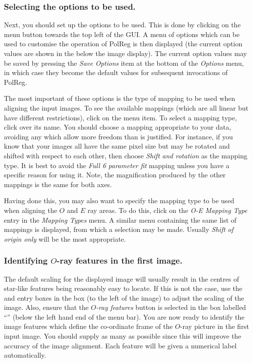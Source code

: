 \subsubsection {Selecting the options to be used.}
Next, you should set up the options to be used. This is done by clicking
on the  menu button towards
the top left of the GUI. A menu of options which can be used to customise
the operation of PolReg is then displayed (the current option values are 
shown in the  below the image 
display). The current option values may be saved by pressing the {\em
Save Options} item at the bottom of the {\em Options} menu, in which case
they become the default values for subsequent invocations of PolReg.

The most important of these options is the type of mapping to be used
when aligning the input images. To see the available mappings (which are
all linear but have different restrictions), click on the  menu item. To select a mapping type,
click over its name. You should choose a mapping appropriate to your
data, avoiding any which allow more freedom than is justified. For
instance, if you know that your images all have the same pixel size but
may be rotated and shifted with respect to each other, then choose {\em
Shift and rotation} as the mapping type. It is best to avoid the {\em
Full 6 parameter fit} mapping unless you have a specific reason for using
it. Note, the magnification produced by the other mappings is the same
for both axes.

Having done this, you may also want to specify the mapping type to be
used when aligning the $O$ and $E$ ray areas. To do this, click on the
{\em O-E Mapping Type} entry in the {\em Mapping Types} menu. A similar
menu containing the same list of mappings is displayed, from which a
selection may be made. Usually {\em Shift of origin only} will be the
most appropriate.


\subsubsection {Identifying $O$-ray features in the first image.}
The default scaling for the displayed image will usually result in the
centres of star-like features being reasonably easy to locate. If this is
not the case, use the  and 
 entry boxes
in the  box
(to the left of the image) to adjust the scaling of the image. Also,
ensure that the {\em $O$-ray features} button is selected in the box
labelled ``'' (below the left hand
end of the menu bar). You are now ready to identify the image features
which define the co-ordinate frame of the $O$-ray picture in the first
input image. You should supply as many as possible since this will
improve the accuracy of the image alignment. Each feature will be given a
numerical label automatically.

